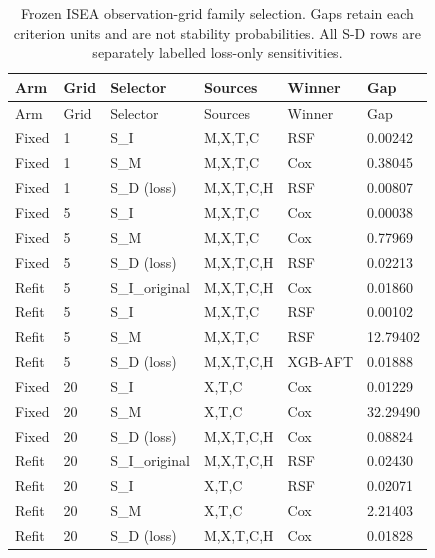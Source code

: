 \begin{longtable}{llllll}
\caption{Frozen ISEA observation-grid family selection. Gaps retain each criterion units and are not stability probabilities. All S-D rows are separately labelled loss-only sensitivities.}\label{tab:v62_select}\\
\toprule
Arm & Grid & Selector & Sources & Winner & Gap\\\midrule\endfirsthead
Arm & Grid & Selector & Sources & Winner & Gap\\\midrule\endhead
Fixed & 1 & S\_I & M,X,T,C & RSF & 0.00242\\
Fixed & 1 & S\_M & M,X,T,C & Cox & 0.38045\\
Fixed & 1 & S\_D (loss) & M,X,T,C,H & RSF & 0.00807\\
Fixed & 5 & S\_I & M,X,T,C & Cox & 0.00038\\
Fixed & 5 & S\_M & M,X,T,C & Cox & 0.77969\\
Fixed & 5 & S\_D (loss) & M,X,T,C,H & RSF & 0.02213\\
Refit & 5 & S\_I\_original & M,X,T,C,H & Cox & 0.01860\\
Refit & 5 & S\_I & M,X,T,C & RSF & 0.00102\\
Refit & 5 & S\_M & M,X,T,C & RSF & 12.79402\\
Refit & 5 & S\_D (loss) & M,X,T,C,H & XGB-AFT & 0.01888\\
Fixed & 20 & S\_I & X,T,C & Cox & 0.01229\\
Fixed & 20 & S\_M & X,T,C & Cox & 32.29490\\
Fixed & 20 & S\_D (loss) & M,X,T,C,H & Cox & 0.08824\\
Refit & 20 & S\_I\_original & M,X,T,C,H & RSF & 0.02430\\
Refit & 20 & S\_I & X,T,C & RSF & 0.02071\\
Refit & 20 & S\_M & X,T,C & Cox & 2.21403\\
Refit & 20 & S\_D (loss) & M,X,T,C,H & Cox & 0.01828\\
\bottomrule\end{longtable}

